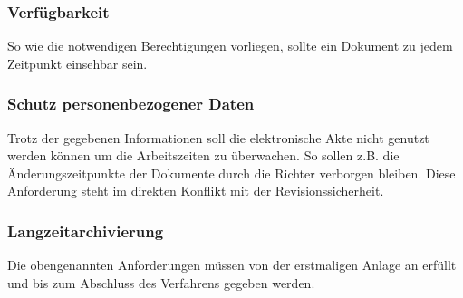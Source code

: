 \subsubsection*{Verfügbarkeit}
So wie die notwendigen Berechtigungen vorliegen, sollte ein Dokument zu jedem Zeitpunkt einsehbar sein.
\subsubsection*{Schutz personenbezogener Daten}
Trotz der gegebenen Informationen soll die elektronische Akte nicht genutzt werden können um die Arbeitszeiten zu überwachen. So sollen z.B. die Änderungszeitpunkte der Dokumente durch die Richter verborgen bleiben. Diese Anforderung steht im direkten Konflikt mit der Revisionssicherheit.
\subsubsection*{Langzeitarchivierung}
Die obengenannten Anforderungen müssen von der erstmaligen Anlage an erfüllt und bis zum Abschluss des Verfahrens gegeben werden.

